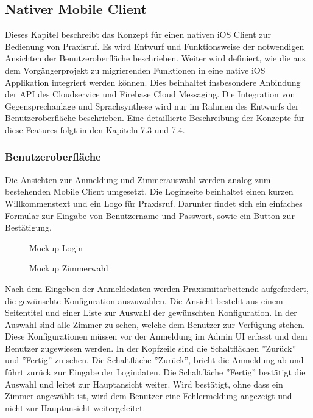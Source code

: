 \subsection{Nativer Mobile Client}

Dieses Kapitel beschreibt das Konzept für einen nativen iOS Client zur Bedienung von Praxisruf.
Es wird Entwurf und Funktionsweise der notwendigen Ansichten der Benutzeroberfläche beschrieben.
Weiter wird definiert, wie die aus dem Vorgängerprojekt zu migrierenden Funktionen in eine native iOS Applikation integriert werden können.
Dies beinhaltet insbesondere Anbindung der API des Cloudservice und Firebase Cloud Messaging.
Die Integration von Gegensprechanlage und Sprachsynthese wird nur im Rahmen des Entwurfs der Benutzeroberfläche beschrieben.
Eine detaillierte Beschreibung der Konzepte für diese Features folgt in den Kapiteln 7.3 und 7.4.


\subsubsection{Benutzeroberfläche}

Die Ansichten zur Anmeldung und Zimmerauswahl werden analog zum bestehenden Mobile Client umgesetzt.
Die Loginseite beinhaltet einen kurzen Willkommenstext und ein Logo für Praxisruf.
Darunter findet sich ein einfaches Formular zur Eingabe von Benutzername und Passwort, sowie ein Button zur Bestätigung.

\begin{figure}[h]
    \centering
    \begin{minipage}[b]{0.4\textwidth}
        \caption{Mockup Login}
    \end{minipage}
    \hfill
    \begin{minipage}[b]{0.4\textwidth}
        \caption{Mockup Zimmerwahl}
    \end{minipage}\label{fig:Mockups-Login-ClientSelection}
\end{figure}

Nach dem Eingeben der Anmeldedaten werden Praxismitarbeitende aufgefordert, die gewünschte Konfiguration auszuwählen.
Die Ansicht besteht aus einem Seitentitel und einer Liste zur Auswahl der gewünschten Konfiguration.
In der Auswahl sind alle Zimmer zu sehen, welche dem Benutzer zur Verfügung stehen.
Diese Konfigurationen müssen vor der Anmeldung im Admin UI erfasst und dem Benutzer zugewiesen werden.
In der Kopfzeile sind die Schaltflächen ''Zurück'' und ''Fertig'' zu sehen.
Die Schaltfläche ''Zurück'', bricht die Anmeldung ab und führt zurück zur Eingabe der Logindaten.
Die Schaltfläche ''Fertig'' bestätigt die Auswahl und leitet zur Hauptansicht weiter.
Wird bestätigt, ohne dass ein Zimmer angewählt ist, wird dem Benutzer eine Fehlermeldung angezeigt und nicht zur Hauptansicht weitergeleitet.

